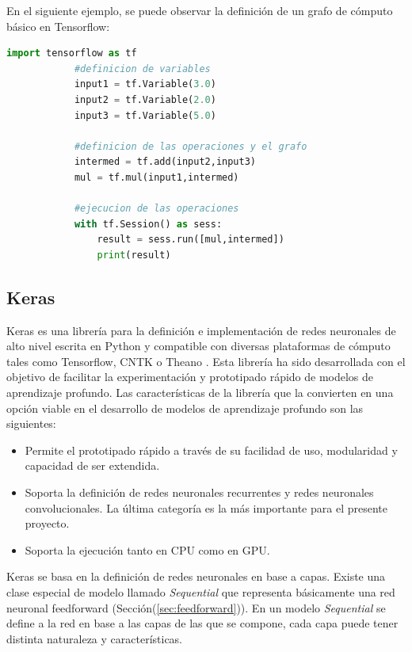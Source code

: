     En el siguiente ejemplo, se puede observar la definición de un grafo de cómputo básico en Tensorflow:

    \begin{lstlisting}[language=Python]
        import tensorflow as tf 
            #definicion de variables
            input1 = tf.Variable(3.0) 
            input2 = tf.Variable(2.0)
            input3 = tf.Variable(5.0)

            #definicion de las operaciones y el grafo
            intermed = tf.add(input2,input3)
            mul = tf.mul(input1,intermed)

            #ejecucion de las operaciones 
            with tf.Session() as sess:
                result = sess.run([mul,intermed])
                print(result) 
    \end{lstlisting}

    \subsection{Keras}
    Keras es una librería para la definición e implementación de redes neuronales de alto nivel escrita en Python y compatible con 
    diversas plataformas de cómputo tales como Tensorflow, CNTK o Theano \cite{chollet2015keras}. Esta librería ha sido desarrollada con el objetivo de 
    facilitar la experimentación y prototipado rápido de modelos de aprendizaje profundo. Las características de la librería que 
    la convierten en una opción viable en el desarrollo de modelos de aprendizaje profundo son las siguientes:

    \begin{itemize}
        \item Permite el prototipado rápido a través de su facilidad de uso, modularidad y capacidad de ser extendida.
        \item Soporta la definición de redes neuronales recurrentes y redes neuronales convolucionales. La última categoría es la más importante para el presente proyecto.
        \item Soporta la ejecución tanto en CPU como en GPU.
    \end{itemize}

    Keras se basa en la definición de redes neuronales en base a capas. Existe una clase especial de modelo llamado \textit{Sequential} que 
    representa básicamente una red neuronal feedforward (Sección(\ref{sec:feedforward})). En un modelo \textit{Sequential} se define 
    a la red en base a las capas de las que se compone, cada capa puede tener distinta naturaleza y características. 
    

